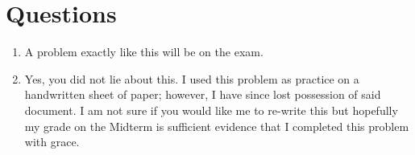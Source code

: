 \tableofcontents 
\newpage

\section{Questions}
    \begin{enumerate}
        \item A	problem	exactly	like this will be on the exam.	
        \item[] Yes, you did not lie about this. I used this problem as practice on a handwritten sheet of paper; however, I have since lost possession of said document. I am not sure if you would like me to re-write this but hopefully my grade on the Midterm is sufficient evidence that I completed this problem with grace.
    \end{enumerate}

%
%


